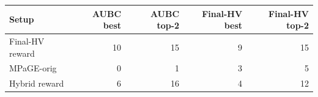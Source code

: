 \begin{tabular}{lrrrr}
\toprule
Setup & AUBC best & AUBC top-2 & Final-HV best & Final-HV top-2 \\
\midrule
Final-HV reward & 10 & 15 & 9 & 15 \\
MPaGE-orig & 0 & 1 & 3 & 5 \\
Hybrid reward & 6 & 16 & 4 & 12 \\
\bottomrule
\end{tabular}

